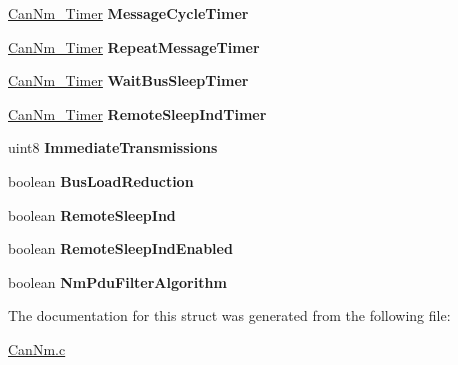 \begin{DoxyCompactItemize}
\item 
\hyperlink{structCanNm__Timer}{Can\+Nm\+\_\+\+Timer} {\bfseries Message\+Cycle\+Timer}\hypertarget{structCanNm__Internal__ChannelType_a3b583582118f6e496054e8af9a55f085}{}\label{structCanNm__Internal__ChannelType_a3b583582118f6e496054e8af9a55f085}

\item 
\hyperlink{structCanNm__Timer}{Can\+Nm\+\_\+\+Timer} {\bfseries Repeat\+Message\+Timer}\hypertarget{structCanNm__Internal__ChannelType_a4e26520b13db2a0b7410b2381530e9f2}{}\label{structCanNm__Internal__ChannelType_a4e26520b13db2a0b7410b2381530e9f2}

\item 
\hyperlink{structCanNm__Timer}{Can\+Nm\+\_\+\+Timer} {\bfseries Wait\+Bus\+Sleep\+Timer}\hypertarget{structCanNm__Internal__ChannelType_afc51f4907b42dbac154656330d2995fd}{}\label{structCanNm__Internal__ChannelType_afc51f4907b42dbac154656330d2995fd}

\item 
\hyperlink{structCanNm__Timer}{Can\+Nm\+\_\+\+Timer} {\bfseries Remote\+Sleep\+Ind\+Timer}\hypertarget{structCanNm__Internal__ChannelType_a77dc1d7662004346e9f6c1798d3cfc55}{}\label{structCanNm__Internal__ChannelType_a77dc1d7662004346e9f6c1798d3cfc55}

\item 
uint8 {\bfseries Immediate\+Transmissions}\hypertarget{structCanNm__Internal__ChannelType_a8970f0988edd8d4b9f393a604cef1eda}{}\label{structCanNm__Internal__ChannelType_a8970f0988edd8d4b9f393a604cef1eda}

\item 
boolean {\bfseries Bus\+Load\+Reduction}\hypertarget{structCanNm__Internal__ChannelType_ae72f7649508a1aad085755baa121e031}{}\label{structCanNm__Internal__ChannelType_ae72f7649508a1aad085755baa121e031}

\item 
boolean {\bfseries Remote\+Sleep\+Ind}\hypertarget{structCanNm__Internal__ChannelType_a11da1260d2f4c09f1df8fb3cc38ad48e}{}\label{structCanNm__Internal__ChannelType_a11da1260d2f4c09f1df8fb3cc38ad48e}

\item 
boolean {\bfseries Remote\+Sleep\+Ind\+Enabled}\hypertarget{structCanNm__Internal__ChannelType_abdad5abb417f5ae6de42702685dff612}{}\label{structCanNm__Internal__ChannelType_abdad5abb417f5ae6de42702685dff612}

\item 
boolean {\bfseries Nm\+Pdu\+Filter\+Algorithm}\hypertarget{structCanNm__Internal__ChannelType_a3ceb26bc9257b15ee4ddffc2fb11f063}{}\label{structCanNm__Internal__ChannelType_a3ceb26bc9257b15ee4ddffc2fb11f063}

\end{DoxyCompactItemize}


The documentation for this struct was generated from the following file\+:\begin{DoxyCompactItemize}
\item 
\hyperlink{CanNm_8c}{Can\+Nm.\+c}\end{DoxyCompactItemize}
